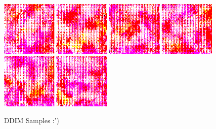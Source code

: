 \documentclass[11pt]{article}
\numberwithin{equation}{section}
\begin{document}
\newpage
\begin{figure}[h]
	\caption{DDIM Samples :')}
	\label{fig:ddimsamples}
	\centering
	\includegraphics[width=0.24\textwidth]{LatentDiffusion/diffusion-samples/ddim32/sample_1.png}%
	\hfill
	\includegraphics[width=0.24\textwidth]{LatentDiffusion/diffusion-samples/ddim32/sample_2.png}%
	\hfill
	\includegraphics[width=0.24\textwidth]{LatentDiffusion/diffusion-samples/ddim32/sample_3.png}
	\hfill
	\includegraphics[width=0.24\textwidth]{LatentDiffusion/diffusion-samples/ddim32/sample_4.png}%
	\hfill
	\includegraphics[width=0.24\textwidth]{LatentDiffusion/diffusion-samples/ddim32/sample_5.png}%
	\hfill
	\includegraphics[width=0.24\textwidth]{LatentDiffusion/diffusion-samples/ddim32/sample_6.png}%

\end{figure}
\end{document}
